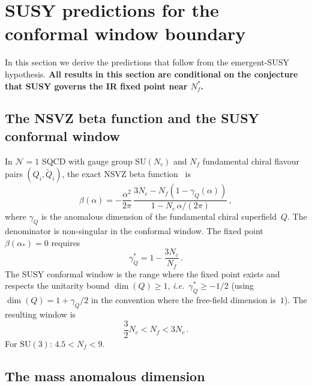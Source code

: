 \documentclass[11pt,a4paper]{article}
\theoremstyle{plain}
\theoremstyle{definition}
\theoremstyle{remark}
\newcommand{\Nc}{N_{\!c}}
\newcommand{\Nf}{N_{\!f}}
\newcommand{\Nfstar}{\Nf^*}
\newcommand{\SU}[1]{\mathrm{SU}(#1)}
\newcommand{\ie}{\textit{i.e.}}
\begin{document}
\section{SUSY predictions for the conformal window boundary}
\label{sec:susy-predictions}

In this section we derive the predictions that follow from the
emergent-SUSY hypothesis.  \textbf{All results in this section are
conditional on the conjecture that SUSY governs the IR fixed point
near $\Nfstar$.}

\subsection{The NSVZ beta function and the SUSY conformal window}

In $\mathcal{N}=1$ SQCD with gauge group $\SU{\Nc}$ and $\Nf$
fundamental chiral flavour pairs $(Q_i, \widetilde{Q}_i)$, the exact
NSVZ beta function~\cite{NSVZ1983} is
\begin{equation}\label{eq:NSVZ}
  \beta(\alpha) = -\frac{\alpha^2}{2\pi}\,
  \frac{3\Nc - \Nf(1 - \gamma_Q(\alpha))}
       {1 - \Nc\,\alpha/(2\pi)}\,,
\end{equation}
where $\gamma_Q$ is the anomalous dimension of the fundamental chiral
superfield~$Q$.  The denominator is non-singular in the conformal
window.  The fixed point $\beta(\alpha_*) = 0$ requires
\begin{equation}\label{eq:gammaQ-star}
  \gamma_Q^* = 1 - \frac{3\Nc}{\Nf}\,.
\end{equation}
The SUSY conformal window is the range where the fixed point exists
and respects the unitarity bound $\dim(Q) \geq 1$, \ie\
$\gamma_Q^* \geq -1/2$ (using $\dim(Q) = 1 + \gamma_Q/2$ in the
convention where the free-field dimension is~$1$).  The resulting
window is
\begin{equation}\label{eq:SUSY-window}
  \frac{3}{2}\Nc < \Nf < 3\Nc\,.
\end{equation}
For $\SU{3}$: $4.5 < \Nf < 9$.

\subsection{The mass anomalous dimension}
\end{document}
